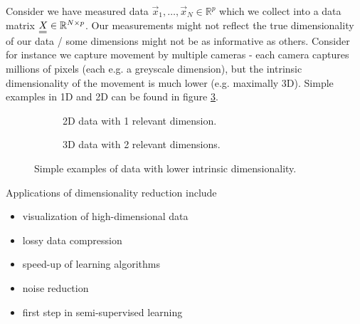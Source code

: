Consider we have measured data $\vec{x}_1, \dots, \vec{x}_N \in \mathbb{R}^p$ which we collect into
a data matrix $\mat{X} \in \mathbb{R}^{N \times p}$. Our measurements might not reflect the true
dimensionality of our data / some dimensions might not be as informative as others. Consider
for instance we capture movement by multiple cameras - each camera captures millions
of pixels (each e.g. a greyscale dimension), but the intrinsic dimensionality of the movement
is much lower (e.g. maximally 3D). Simple examples in 1D and 2D can be found in figure \ref{fig:dimred}.

\begin{figure}

    \centering
    \begin{subfigure}{0.55\textwidth}
      \centering
      
      \caption{2D data with 1 relevant dimension.}
      \label{fig:dimred1}
    \end{subfigure}%

    \begin{subfigure}{0.75\textwidth}
        \centering
        
        \caption{3D data with 2 relevant dimensions.}
        \label{fig:dimred2}
      \end{subfigure}

    \caption{Simple examples of data with lower intrinsic dimensionality.}
    \label{fig:dimred}

\end{figure}


Applications of dimensionality reduction include
\begin{itemize}
    \item visualization of high-dimensional data
    \item lossy data compression
    \item speed-up of learning algorithms
    \item noise reduction
    \item first step in semi-supervised learning
\end{itemize}

